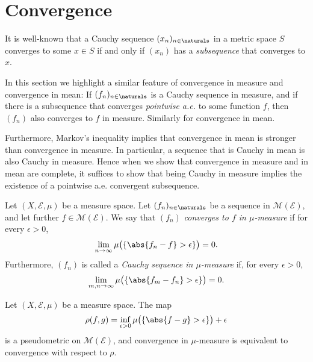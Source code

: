 \documentclass[article, a4paper, 11pt, oneside]{memoir}
\numberwithin{equation}{chapter}
\newcommand{\calE}{\mathcal{E}}
\newcommand{\measurable}{\mathcal{M}}
\begin{document}
\chapter{Convergence}

It is well-known that a Cauchy sequence $(x_n)_{n\in\naturals}$ in a metric space $S$ converges to some $x \in S$ if and only if $(x_n)$ has a \emph{subsequence} that converges to $x$.

In this section we highlight a similar feature of convergence in measure and convergence in mean: If $(f_n)_{n\in\naturals}$ is a Cauchy sequence in measure, and if there is a subsequence that converges \emph{pointwise a.e.} to some function $f$, then $(f_n)$ also converges to $f$ in measure. Similarly for convergence in mean.

Furthermore, Markov's inequality implies that convergence in mean is stronger than convergence in measure. In particular, a sequence that is Cauchy in mean is also Cauchy in measure. Hence when we show that convergence in measure and in mean are complete, it suffices to show that being Cauchy in measure implies the existence of a pointwise a.e. convergent subsequence.

\begin{definition}
    Let $(X,\calE,\mu)$ be a measure space. Let $(f_n)_{n\in\naturals}$ be a sequence in $\measurable(\calE)$, and let further $f \in \measurable(\calE)$. We say that $(f_n)$ \emph{converges to $f$ in $\mu$-measure} if for every $\epsilon > 0$,
    \begin{equation*}
        \lim_{n\to\infty} \mu\bigl( \{ \abs{f_n - f} > \epsilon \}\bigr) = 0.
    \end{equation*}
    Furthermore, $(f_n)$ is called a \emph{Cauchy sequence in $\mu$-measure} if, for every $\epsilon > 0$,
    \begin{equation*}
        \lim_{m,n\to\infty} \mu\bigl( \{ \abs{f_m - f_n} > \epsilon \} \bigr) = 0.
    \end{equation*}
\end{definition}


\begin{proposition}
    Let $(X,\calE,\mu)$ be a measure space. The map
    \begin{equation*}
        \rho(f,g)
            = \inf_{\epsilon > 0} \mu\bigl( \{ \abs{f - g} > \epsilon \}\bigr) + \epsilon
    \end{equation*}
    is a pseudometric on $\measurable(\calE)$, and convergence in $\mu$-measure is equivalent to convergence with respect to $\rho$.
\end{proposition}
\end{document}
